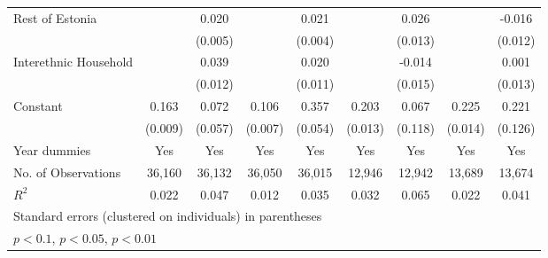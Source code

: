\begin{sidewaystable}
\begin{tabular}{l*{2}{c}| *{2}{c}| *{2}{c}| *{2}{c}}
Rest of Estonia                &                     &       0.020\sym{***}&                     &       0.021\sym{***}&                     &       0.026\sym{*}  &                     &      -0.016         \\
&                     &     (0.005)         &                     &     (0.004)         &                     &     (0.013)         &                     &     (0.012)         \\
Interethnic Household&                     &       0.039\sym{***}&                     &       0.020\sym{*}  &                     &      -0.014         &                     &       0.001         \\
&                     &     (0.012)         &                     &     (0.011)         &                     &     (0.015)         &                     &     (0.013)         \\

Constant            &       0.163\sym{***}&       0.072         &       0.106\sym{***}&       0.357\sym{***}&       0.203\sym{***}&       0.067         &       0.225\sym{***}&       0.221\sym{*}  \\
&     (0.009)         &     (0.057)         &     (0.007)         &     (0.054)         &     (0.013)         &     (0.118)         &     (0.014)         &     (0.126)         \\
	Year dummies        &         Yes         &         Yes         &         Yes         &         Yes         &         Yes         &         Yes         &         Yes         &         Yes         \\
	\midrule
No. of	Observations        &       36,160         &       36,132         &       36,050         &       36,015         &       12,946         &       12,942         &       13,689         &       13,674         \\
	 \(R^{2}\)  &       0.022         &       0.047         &       0.012         &       0.035         &       0.032         &       0.065         &       0.022         &       0.041         \\
	\bottomrule
	\multicolumn{9}{l}{\footnotesize Standard errors (clustered on individuals) in parentheses}\\
	\multicolumn{9}{l}{\footnotesize \sym{*} \(p<0.1\), \sym{**} \(p<0.05\), \sym{***} \(p<0.01\)}
\end{tabular}
\end{sidewaystable}